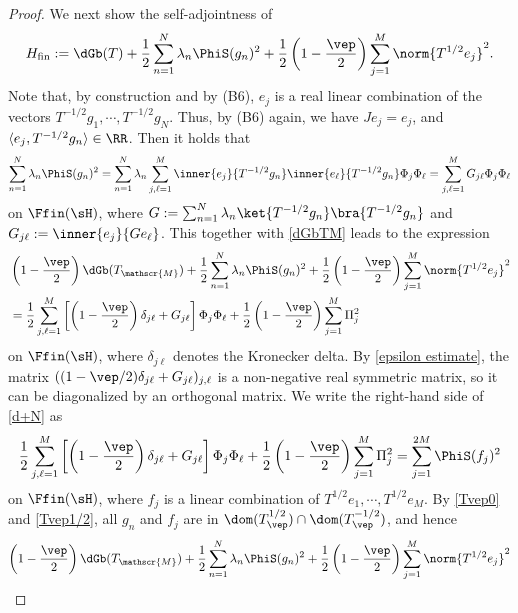 \documentclass[12pt]{article}
\theoremstyle{plain}
\numberwithin{equation}{section}
\theoremstyle{remark}
\begin{document}
\begin{proof}
We next show the self-adjointness of 
\[
H_{\rm fin}:=\dGb(T)+\frac{1}{2}\sum_{n=1}^N \lambda_n \PhiS(g_n)^2 + \frac{1}{2}\left(1-\frac{\vep}{2}\right) \sum_{j=1}^M \norm{T^{1/2}e_j}^2.
\]
Note that, by construction and by (B6), $e_j$ is a real linear combination of the vectors $T^{-1/2}g_1,\cdots,T^{-1/2}g_N$.
Thus, by (B6) again, we have $Je_j=e_j$, and $\langle e_j,T^{-1/2}g_n\rangle\in\RR$.
Then it holds that
\begin{align*}
 \sum_{n=1}^N \lambda_n \PhiS(g_n)^2
 = \sum_{n=1}^N \lambda_n \sum_{j,\ell=1}^M \inner{e_j}{T^{-1/2}g_n} \inner{e_\ell}{T^{-1/2}g_n} \Phi_j \Phi_\ell  
 = \sum_{j,\ell=1}^M G_{j\ell}\Phi_j \Phi_\ell  
\end{align*}
on $\Ffin(\sH)$, where $G:=\sum_{n=1}^N\lambda_n\ket{T^{-1/2}g_n} \bra{T^{-1/2}g_n}$ and $G_{j\ell}:=\inner{e_j}{Ge_\ell}$.
This together with \eqref{dGbTM} leads to the expression
\begin{align}\label{d+N}
&\left(1-\frac{\vep}{2}\right)\dGb(T_\mathscr{M}) + \frac{1}{2}\sum_{n=1}^N \lambda_n \PhiS(g_n)^2 + \frac{1}{2}\left(1-\frac{\vep}{2}\right) \sum_{j=1}^M \norm{T^{1/2}e_j}^2 \notag \\
&= \frac{1}{2}\sum_{j,\ell=1}^M \left[\left(1-\frac{\vep}{2}\right)\delta_{j\ell}+G_{j\ell}\right]\Phi_j \Phi_\ell  + \frac{1}{2}\left(1-\frac{\vep}{2}\right)\sum_{j=1}^M \Pi_j^2
\end{align}
on $\Ffin(\sH)$, where $\delta_{j\ell}$ denotes the Kronecker delta.
By \eqref{epsilon estimate}, the matrix $((1-\vep/2)\delta_{j\ell}+G_{j\ell})_{j,\ell}$ is a non-negative real symmetric matrix, 
so it can be diagonalized by an orthogonal matrix.
We write the right-hand side of \eqref{d+N} as
\begin{equation*}
  \frac{1}{2}\sum_{j,\ell=1}^M \left[\left(1-\frac{\vep}{2}\right)\delta_{j\ell}+G_{j\ell}\right]\Phi_j \Phi_\ell 
+ \frac{1}{2}\left(1-\frac{\vep}{2}\right)\sum_{j=1}^M \Pi_j^2
= \sum_{j=1}^{2M} \PhiS(f_j)^2
\end{equation*}
on $\Ffin(\sH)$,
where $f_j$ is a linear combination of $T^{1/2}e_1,\cdots,T^{1/2}e_M$.
By \eqref{Tvep0} and \eqref{Tvep1/2}, all $g_n$ and $f_j$ are in $\dom(T_\vep^{1/2})\cap\dom(T_\vep^{-1/2})$, and hence
\begin{equation*}
\left(1-\frac{\vep}{2}\right)\dGb(T_\mathscr{M}) + \frac{1}{2}\sum_{n=1}^N \lambda_n \PhiS(g_n)^2 + \frac{1}{2}\left(1-\frac{\vep}{2}\right) \sum_{j=1}^M \norm{T^{1/2}e_j}^2

\end{equation*}
\end{proof}
\end{document}
